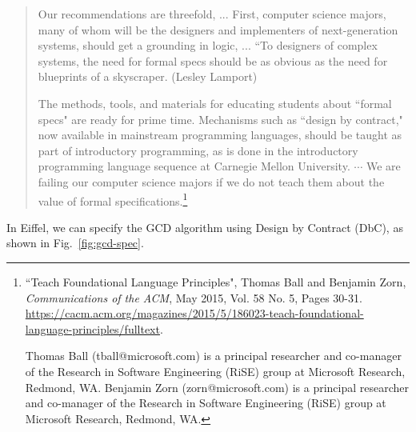 \documentclass[runningheads,12pt]{article}
\begin{document}
\begin{quote}

Our recommendations are threefold, ... First, computer science majors, many of whom will be the designers and implementers of next-generation systems, should get a grounding in logic, ... “To designers of complex systems, the need for formal specs should be as obvious as the need for blueprints of a skyscraper. (Lesley Lamport) 

The methods, tools, and materials for educating students about ``formal specs" are ready for prime time. Mechanisms such as ``design by contract," now available in mainstream programming languages, should be taught as part of introductory programming, as is done in the introductory programming language sequence at Carnegie Mellon University. $\cdots$ We are failing our computer science majors if we do not teach them about the value of formal specifications.\footnote{%
``Teach Foundational Language Principles", Thomas Ball and Benjamin Zorn, \textit{Communications of the ACM}, May 2015, Vol. 58 No. 5, Pages 30-31. \url{https://cacm.acm.org/magazines/2015/5/186023-teach-foundational-language-principles/fulltext}. 

Thomas Ball (tball@microsoft.com) is a principal researcher and co-manager of the Research in Software Engineering (RiSE) group at Microsoft Research, Redmond, WA. Benjamin Zorn (zorn@microsoft.com) is a principal researcher and co-manager of the Research in Software Engineering (RiSE) group at Microsoft Research, Redmond, WA.} 
\end{quote}

In Eiffel, we can specify the GCD algorithm using Design by Contract (DbC), as shown in Fig.~\ref{fig:gcd-spec}.
\end{document}
